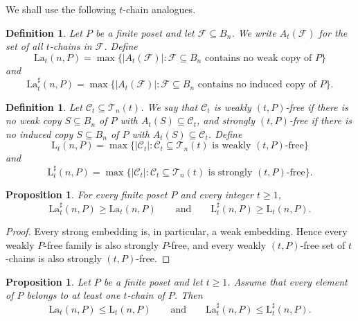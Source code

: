 \documentclass[twoside,12pt]{article}
\newtheorem{definition}[theorem]{Definition}
\newtheorem{proposition}[theorem]{Proposition}
\newcommand{\LaT}{\mathrm{La}}
\newcommand{\LT}{\mathrm{L}}
\begin{document}
We shall use the following $t$-chain analogues.

\begin{definition}\label{def:La_t}
Let $P$ be a finite poset and let $\mathcal F\subseteq B_n$. We write $A_t(\mathcal F)$ for the set of all $t$-chains in $\mathcal F$. Define
\[
\LaT_t(n,P)=\max\{|A_t(\mathcal F)|:\mathcal F\subseteq B_n\text{ contains no weak copy of }P\}
\]
and
\[
\LaT_t^\sharp(n,P)=\max\{|A_t(\mathcal F)|:\mathcal F\subseteq B_n\text{ contains no induced copy of }P\}.
\]
\end{definition}

\begin{definition}\label{def:L_t}
Let $\mathcal C_t\subseteq \mathcal T_n(t)$. We say that $\mathcal C_t$ is \emph{weakly $(t,P)$-free} if there is no weak copy $S\subseteq B_n$ of $P$ with $A_t(S)\subseteq \mathcal C_t$, and \emph{strongly $(t,P)$-free} if there is no induced copy $S\subseteq B_n$ of $P$ with $A_t(S)\subseteq \mathcal C_t$. Define
\[
\LT_t(n,P)=\max\{|\mathcal C_t|:\mathcal C_t\subseteq \mathcal T_n(t)\text{ is weakly $(t,P)$-free}\}
\]
and
\[
\LT_t^\sharp(n,P)=\max\{|\mathcal C_t|:\mathcal C_t\subseteq \mathcal T_n(t)\text{ is strongly $(t,P)$-free}\}.
\]
\end{definition}

\begin{proposition}\label{prop:weak-strong-monotone}
For every finite poset $P$ and every integer $t\ge1$,
\[
\LaT_t^\sharp(n,P)\ge \LaT_t(n,P)
\qquad\text{and}\qquad
\LT_t^\sharp(n,P)\ge \LT_t(n,P).
\]
\end{proposition}

\begin{proof}
Every strong embedding is, in particular, a weak embedding. Hence every weakly $P$-free family is also strongly $P$-free, and every weakly $(t,P)$-free set of $t$-chains is also strongly $(t,P)$-free.
\end{proof}

\begin{proposition}\label{prop:La-vs-L}
Let $P$ be a finite poset and let $t\ge1$. Assume that every element of $P$ belongs to at least one $t$-chain of $P$. Then
\[
\LaT_t(n,P)\le \LT_t(n,P)
\qquad\text{and}\qquad
\LaT_t^\sharp(n,P)\le \LT_t^\sharp(n,P).
\]
\end{proposition}
\end{document}
